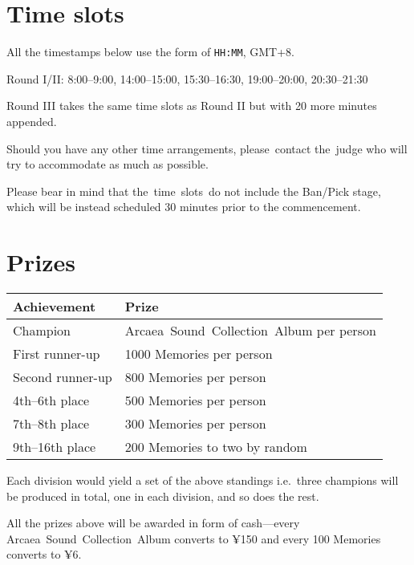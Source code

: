 \documentclass{article}
\begin{document}
\section{Time slots}

All the timestamps below use the form of
\texttt{HH:MM}, GMT+8.

Round I/II: 8:00--9:00, 14:00--15:00, 15:30--16:30, 19:00--20:00, 20:30--21:30

Round III takes the same time slots as Round II
but with 20 more minutes appended.

Should you have any other time arrangements,
please contact the judge who will
try to accommodate as much as possible.

Please bear in mind that
the time slots do not include the Ban/Pick stage,
which will be instead scheduled 30 minutes prior to the commencement.

\section{Prizes}

\begin{table}[!htbp]
	\centering
	\begin{tabular}{ll}
		\hline
		Achievement  %
		                 & Prize                                    \\ \hline
		Champion         & Arcaea Sound Collection Album per person \\
		First runner-up  & 1000 Memories per person                 \\
		Second runner-up & 800 Memories per person                  \\
		4th--6th place   & 500 Memories per person                  \\
		7th--8th place   & 300 Memories per person                  \\
		9th--16th place  & 200 Memories to two by random            \\ \hline
	\end{tabular}
\end{table}

Each division would yield a set of the above standings
i.e.~three champions will be produced in total,
one in each division, and so does the rest.

All the prizes above will be awarded in form of  %
cash---every Arcaea Sound Collection Album converts to ¥150
and every 100 Memories converts  %
to ¥6.
\end{document}
